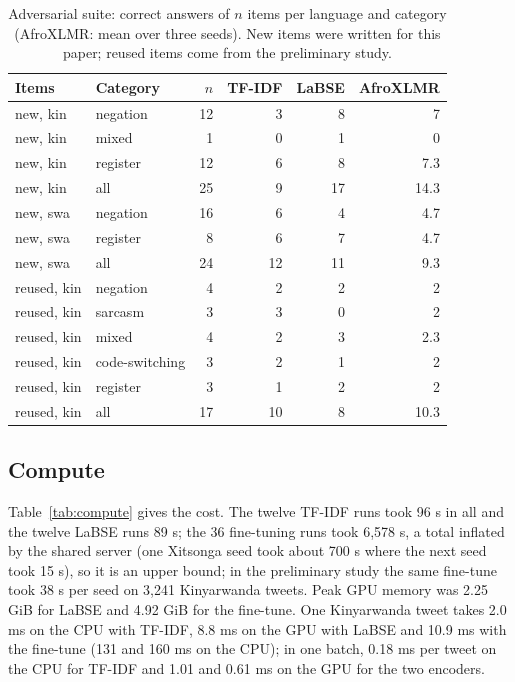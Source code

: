 \documentclass[11pt]{article}
\begin{document}
\begin{table}[t]
\centering
\scriptsize
\setlength{\tabcolsep}{3.5pt}
\begin{tabular}{llrrrr}
\toprule
Items & Category & $n$ & TF-IDF & LaBSE & AfroXLMR \\
\midrule
new, kin & negation & 12 & 3 & 8 & 7 \\
new, kin & mixed & 1 & 0 & 1 & 0 \\
new, kin & register & 12 & 6 & 8 & 7.3 \\
new, kin & all & 25 & 9 & 17 & 14.3 \\
\midrule
new, swa & negation & 16 & 6 & 4 & 4.7 \\
new, swa & register & 8 & 6 & 7 & 4.7 \\
new, swa & all & 24 & 12 & 11 & 9.3 \\
\midrule
reused, kin & negation & 4 & 2 & 2 & 2 \\
reused, kin & sarcasm & 3 & 3 & 0 & 2 \\
reused, kin & mixed & 4 & 2 & 3 & 2.3 \\
reused, kin & code-switching & 3 & 2 & 1 & 2 \\
reused, kin & register & 3 & 1 & 2 & 2 \\
reused, kin & all & 17 & 10 & 8 & 10.3 \\
\bottomrule
\end{tabular}
\caption{Adversarial suite: correct answers of $n$ items per language and category (AfroXLMR: mean over three seeds). New items were written for this paper; reused items come from the preliminary study.}
\label{tab:suite}
\end{table}

\subsection{Compute}
Table~\ref{tab:compute} gives the cost. The twelve TF-IDF runs took 96 s in all and the twelve LaBSE runs 89 s; the 36 fine-tuning runs took 6,578 s, a total inflated by the shared server (one Xitsonga seed took about 700 s where the next seed took 15 s), so it is an upper bound; in the preliminary study the same fine-tune took 38 s per seed on 3,241 Kinyarwanda tweets. Peak GPU memory was 2.25 GiB for LaBSE and 4.92 GiB for the fine-tune. One Kinyarwanda tweet takes 2.0 ms on the CPU with TF-IDF, 8.8 ms on the GPU with LaBSE and 10.9 ms with the fine-tune (131 and 160 ms on the CPU); in one batch, 0.18 ms per tweet on the CPU for TF-IDF and 1.01 and 0.61 ms on the GPU for the two encoders.
\end{document}
